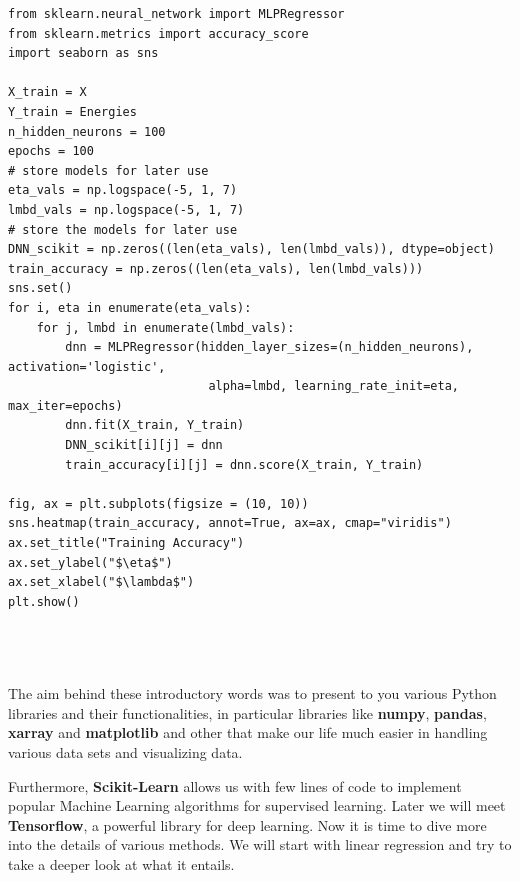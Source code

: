 \documentclass{beamer}
\begin{document}
\begin{frame}
\begin{verbatim}
from sklearn.neural_network import MLPRegressor
from sklearn.metrics import accuracy_score
import seaborn as sns

X_train = X
Y_train = Energies
n_hidden_neurons = 100
epochs = 100
# store models for later use
eta_vals = np.logspace(-5, 1, 7)
lmbd_vals = np.logspace(-5, 1, 7)
# store the models for later use
DNN_scikit = np.zeros((len(eta_vals), len(lmbd_vals)), dtype=object)
train_accuracy = np.zeros((len(eta_vals), len(lmbd_vals)))
sns.set()
for i, eta in enumerate(eta_vals):
    for j, lmbd in enumerate(lmbd_vals):
        dnn = MLPRegressor(hidden_layer_sizes=(n_hidden_neurons), activation='logistic',
                            alpha=lmbd, learning_rate_init=eta, max_iter=epochs)
        dnn.fit(X_train, Y_train)
        DNN_scikit[i][j] = dnn
        train_accuracy[i][j] = dnn.score(X_train, Y_train)

fig, ax = plt.subplots(figsize = (10, 10))
sns.heatmap(train_accuracy, annot=True, ax=ax, cmap="viridis")
ax.set_title("Training Accuracy")
ax.set_ylabel("$\eta$")
ax.set_xlabel("$\lambda$")
plt.show()




\end{verbatim}




The aim behind these introductory words was to present to you various
Python libraries and their functionalities, in particular libraries like
\textbf{numpy}, \textbf{pandas}, \textbf{xarray} and \textbf{matplotlib} and other that make our life much easier
in handling various data sets and visualizing data. 

Furthermore,
\textbf{Scikit-Learn} allows us with few lines of code to implement popular
Machine Learning algorithms for supervised learning. Later we will meet \textbf{Tensorflow}, a powerful library for deep learning. 
Now it is time to dive more into the details of various methods. We will start with linear regression and try to take a deeper look at what it entails.
\end{frame}
\end{document}
